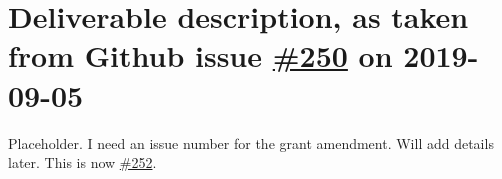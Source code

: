 \hypertarget{deliverable-description-as-taken-from-github-issue-250-on-2019-09-05}{%
\section*{\texorpdfstring{Deliverable description, as taken from Github
issue
\href{https://github.com/OpenDreamKit/OpenDreamKit/issues/250}{\#250} on
2019-09-05}{Deliverable description, as taken from Github issue \#250 on 2019-09-05}}\label{deliverable-description-as-taken-from-github-issue-250-on-2019-09-05}}

Placeholder. I need an issue number for the grant amendment. Will add
details later. This is now
\href{https://github.com/OpenDreamKit/OpenDreamKit/issues/252}{\#252}.

